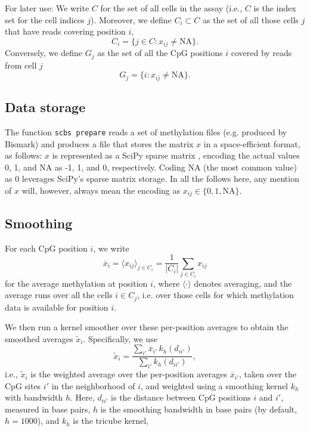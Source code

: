\documentclass[twocolumn,10pt]{article}
\newcommand{\todo}[1]{[\textcolor{orange}{#1}]}
\begin{document}
For later use: We write $C$ for the set of all cells in the assay (i.e., $C$ is the index set for the cell indices $j$). Moreover,
we define $C_i\subset C$ as the set of all those cells $j$ that have reads covering position $i$,
$$ C_i=\{j\in C: x_{ij}\neq\text{NA}\}.$$
Conversely, we define $G_j$ as the set of all the CpG positions $i$ covered by reads from cell $j$ 
$$ G_j=\{i: x_{ij}\neq\text{NA}\}.$$

\subsection{Data storage}

The function \texttt{scbs prepare} reads a set of methylation files (e.g. produced by Bismark) and produces a file that stores the matrix $x$ in a space-efficient format, as follows: $x$ is represented as a SciPy sparse matrix \citep{SciPy}, encoding the actual values 0, 1, and NA as -1, 1, and 0, respectively. Coding NA (the most common value) as 0 leverages SciPy's sparse matrix storage. In all the follows here, any mention of $x$ will, however, always mean the encoding as $x_{ij}\in\{0,1,\text{NA}\}$.

\subsection{Smoothing}

For each CpG position $i$, we write 
$$\overline{x}_i=\langle x_{ij} \rangle_{j\in C_i} = \frac{1}{|C_i|}\sum_{j\in C_i} x_{ij}$$ 
for the average methylation at position $i$, where $\langle\cdot\rangle$ denotes averaging, and the average runs over all the cells $i\in C_j$, i.e. over those cells for which methylation data is available for position $i$.


We then run a kernel smoother over these per-position averages to obtain the smoothed averages $\tilde x_i$. Specifically, we use
\[ \tilde x_i = \frac{\sum_{i'} \overline x_{i'}\, k_h(d_{ii'})}{\sum_{i'} k_h(d_{ii'})},\]
i.e., $\tilde x_i$ is the weighted average over the per-position averages $\overline{x}_{i'}$, taken over the CpG sites $i'$ in the neighborhood of $i$, and weighted using a smoothing kernel $k_h$ with bandwidth $h$. Here, $d_{ii'}$ is the distance between CpG positions $i$ and $i'$, measured in base pairs, $h$ is the smoothing bandwidth in base pairs (by default, $h=1000$), and $k_h$ is the tricube kernel,
\end{document}
